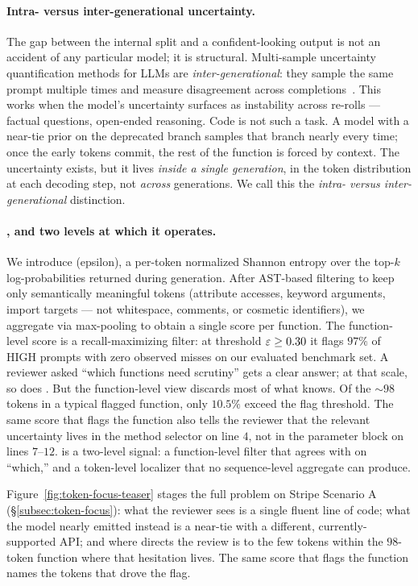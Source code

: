 \paragraph{Intra- versus inter-generational uncertainty.}
The gap between the internal split and a confident-looking output
is not an accident of any particular model; it is structural.
Multi-sample uncertainty quantification methods for LLMs are
\emph{inter-generational}: they sample the same prompt multiple
times and measure disagreement across completions~\cite{kuhn2023semantic,%
uqlm2024,sharma2025multisample}. This works when the model's
uncertainty surfaces as instability across re-rolls --- factual
questions, open-ended reasoning. Code is not such a task. A model
with a near-tie prior on the deprecated branch samples that branch
nearly every time; once the early tokens commit, the rest of the
function is forced by context. The uncertainty exists, but it
lives \emph{inside a single generation}, in the token distribution at
each decoding step, not \emph{across} generations. We call this the
\emph{intra- versus inter-generational} distinction.

\paragraph{\eps, and two levels at which it operates.}
We introduce \eps (epsilon), a per-token normalized Shannon entropy
over the top-$k$ log-probabilities returned during generation. After
AST-based filtering to keep only semantically meaningful tokens
(attribute accesses, keyword arguments, import targets --- not
whitespace, comments, or cosmetic identifiers), we aggregate via
max-pooling to obtain a single score per function. The function-level
score is a recall-maximizing filter: at threshold $\varepsilon \ge 0.30$ it
flags $97\%$ of HIGH prompts with zero observed misses on
our evaluated benchmark set. A reviewer asked ``which functions need scrutiny''
gets a clear answer; at that scale, so does \papg. But the
function-level view discards most of what \eps knows. Of the
$\sim 98$ tokens in a typical flagged function, only $10.5\%$ exceed
the flag threshold. The same score that flags the function also tells
the reviewer that the relevant uncertainty lives in the method
selector on line $4$, not in the parameter block on lines $7$--$12$.
\eps is a two-level signal: a function-level filter that agrees with
\papg on ``which,'' and a token-level localizer that no sequence-level
aggregate can produce.

Figure~\ref{fig:token-focus-teaser} stages the full problem on Stripe
Scenario A (\S\ref{subsec:token-focus}): what the reviewer sees is a
single fluent line of code; what the model nearly emitted instead is
a near-tie with a different, currently-supported API; and where \eps
directs the review is to the few tokens within the $98$-token
function where that hesitation lives. The same score that flags the
function names the tokens that drove the flag.


